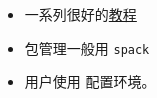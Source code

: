 
\begin{issues}
\issueDraft
\end{issues}

\begin{itemize}
\item 一系列很好的\href{https://hpc-tutorials.llnl.gov/}{教程}
\item 包管理一般用 \verb|spack|
\item 用户使用  配置环境。
\end{itemize}
